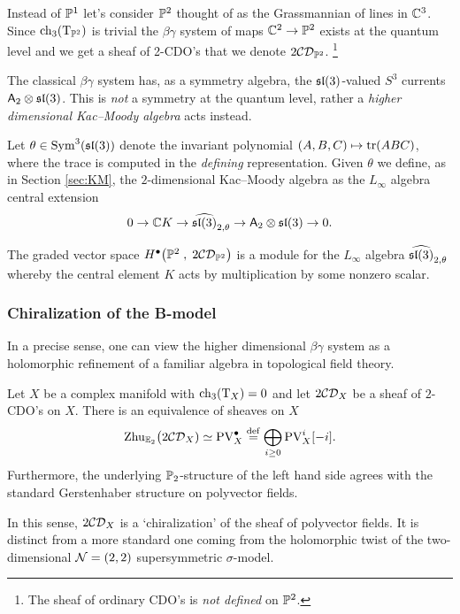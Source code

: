 \documentclass[11pt]{amsart}
\def\CDO{{\cC\cD}}
\begin{document}
Instead of $\PP^1$ let's consider $\PP^2$ thought of as the Grassmannian of lines in $\CC^3$. 
Since $\ch_3(\T_{\PP^2})$ is trivial
the $\beta\gamma$ system of maps $\CC^2 \to \PP^2$ exists at the quantum level and we get a sheaf of 2-CDO's that we denote $2\CDO_{\PP^2}$. \footnote{The sheaf of ordinary CDO's is {\em not defined} on $\PP^2$.} 

The classical $\beta\gamma$ system has, as a symmetry algebra, the $\sl(3)$-valued $S^3$ currents $\sfA_2 \otimes \sl(3)$. 
This is {\em not} a symmetry at the quantum level, rather a {\em higher dimensional Kac--Moody algebra} acts instead.

Let $\theta \in {\rm Sym}^3(\sl(3))$ denote the invariant polynomial $(A,B,C) \mapsto {\rm tr}(ABC)$, where the trace is computed in the {\em defining} representation.
Given $\theta$ we define, as in Section \ref{sec:KM}, the $2$-dimensional Kac--Moody algebra as the $L_\infty$ algebra central extension
\[
0 \to \CC K \to \Hat{\sl(3)}_{2,\theta} \to \sfA_2 \otimes \sl(3) \to 0 .
\]

\begin{prop}
The graded vector space $H^\bu \big(\PP^2 \; , \; 2 \CDO_{\PP^2}\big)$ is a module for the $L_\infty$ algebra $\Hat{\sl(3)}_{2, \theta}$ whereby the central element $K$ acts by multiplication by some nonzero scalar. 
\end{prop}


\subsubsection{Chiralization of the B-model}

In a precise sense, one can view the higher dimensional $\beta\gamma$ system as a holomorphic refinement of a familiar algebra in topological field theory.

\begin{prop}
Let $X$ be a complex manifold with ${\rm ch}_{3}(\T_X) = 0$ and let $2\CDO_X$ be a sheaf of $2$-CDO's on $X$. 
There is an equivalence of sheaves on $X$
\[
{\rm Zhu}_{\EE_2} \big(2\CDO_X) \simeq {\rm PV}^{\bu}_X \define \bigoplus_{i\geq 0} {\rm PV}^i_X [-i] .
\]
Furthermore, the underlying $\PP_2$-structure of the left hand side agrees with the standard Gerstenhaber structure on polyvector fields.
\end{prop}

\begin{rmk}
In this sense, $2\CDO_X$ is a `chiralization' of the sheaf of polyvector fields.
It is distinct from a more standard one coming from the holomorphic twist of the two-dimensional $\cN=(2,2)$ supersymmetric $\sigma$-model.
\end{rmk}
\end{document}
